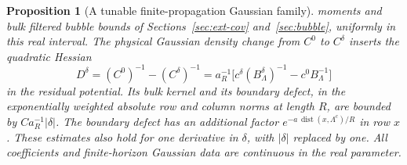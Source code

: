 \documentclass[11pt]{article}
\newtheorem{proposition}[theorem]{Proposition}
\theoremstyle{definition}
\newcommand{\dist}{\operatorname{dist}}
\begin{document}
\begin{proposition}[A tunable finite-propagation Gaussian family]
moments and bulk filtered bubble bounds of
Sections~\ref{sec:ext-cov} and~\ref{sec:bubble}, uniformly in
this real interval. The physical Gaussian density change from
\(C^0\) to \(C^\delta\) inserts the quadratic Hessian
\begin{equation}
 D^\delta=(C^0)^{-1}-(C^\delta)^{-1}
   =a_R^{-1}\bigl[c^\delta(B^\delta_\Lambda)^{-1}
                         -c^0 B_\Lambda^{-1}\bigr]
\end{equation}
in the residual potential. Its bulk kernel and its
boundary defect, in the exponentially weighted absolute
row and column norms at length \(R\), are bounded by
\(C a_R^{-1}|\delta|\). The boundary defect has an additional
factor \(e^{-a\,\dist(x,\Lambda^c)/R}\) in row \(x\).
These estimates also hold for one derivative in \(\delta\),
with \(|\delta|\) replaced by one. All coefficients and
finite-horizon Gaussian data are continuous in the real
parameter.
\end{proposition}
\end{document}
